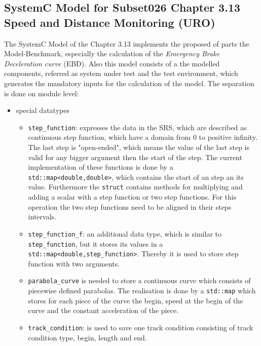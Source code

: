 \documentclass{template/openetcs_article}
\begin{document}
\subsection{SystemC Model for Subset026 Chapter 3.13 Speed and Distance Monitoring (URO)}

The SystemC Model of the Chapter 3.13 implements the proposed of parts the Model-Benchmark, especially the calculation of the \emph{Emergency Brake Deceleration curve} (EBD). Also this model consists of a the modelled components, referred as system under test and the test environment, which generates the mandatory inputs for the calculation of the model. The separation is done on module level:
\begin{itemize}
	\item special datatypes
	\begin{itemize}
	\item \verb|step_function|: expresses the data in the SRS, which are described as continuous step function, which have a domain from 0 to positive infinity. The last step is "open-ended", which means the value of the last step is valid for any bigger argument then the start of the step. The current implementation of these functions is done by a \verb|std::map<double,double>|, which contains the start of an step an its value. Furthermore the \verb|struct| contains methods for multiplying and adding a scalar with a step function or two step functions. For this operation the two step functions need to be aligned in their steps intervals.
	\item \verb|step_function_f|: an additional data type, which is similar to \verb|step_function|, but it stores its values in a \verb|std::map<double,step_function>|. Thereby it is used to store step function with two arguments.
	\item \verb|parabola_curve| is needed to store a continuous curve which consists of piecewise defined parabolas. The realisation is done by a \verb|std::map| which stores for each piece of the curve the begin, speed at the begin of the curve and the constant acceleration of the piece. 
	
	\item \verb|track_condition|: is used to save one track condition consisting of track condition type, begin, length and end.
	

\end{itemize}
\end{itemize}
\end{document}
